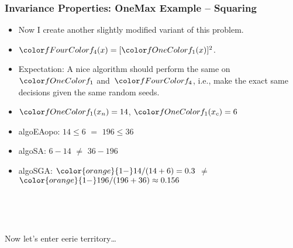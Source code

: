 \documentclass[aspectratio=169,mathserif,notheorems]{beamer}%
\begin{document}
\begin{frame}%
\frametitle{Invariance Properties: OneMax Example -- Squaring}%
\parbox{0.415\paperwidth}{%
\begin{itemize}%
\item Now I create another slightly modified variant of this problem.%
\item<2-> $\fn{4}(x)=[\fn{1}(x)]^2$.%
\item<3-> Expectation: A nice algorithm should perform the same on~$\fn{1}$ and~$\fn{4}$, i.e., make the exact same decisions given the same random seeds.%
%
\item<4-> $\fn{1}(x_n)=14$, $\fn{1}(x_c)=6$%
%
\item<6-> \gls{algoEAopo}: $14\leq6$ \textcolor{greenYesColor}{$\mathbf{=}$} $196\leq36$ \greenYes%
%
\item<7-> \gls{algoSA}: $6-14$ \textcolor{redNoColor}{$\mathbf{\neq}$} $36-196$ \redNo%
%
\item<8-> \gls{algoSGA}: ${\color{orange}{1-}}14/(14+6)=0.3$ \textcolor{redNoColor}{$\mathbf{\neq}$} ${\color{orange}{1-}}196/(196+36)\approx0.156$ \redNo%
\end{itemize}%
}%
%
%
%
%
%
%
%
\end{frame}%
%
\begin{frame}%
\centering%
\strut\\\strut\vfill\strut\\\strut%
{\large{Now let's enter eerie territory\dots}}%
\strut\\\strut\vfill\strut\\\strut%
\end{frame}%
%
\end{document}

